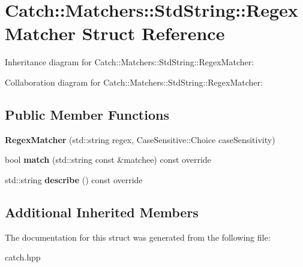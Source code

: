 \hypertarget{structCatch_1_1Matchers_1_1StdString_1_1RegexMatcher}{}\section{Catch\+:\+:Matchers\+:\+:Std\+String\+:\+:Regex\+Matcher Struct Reference}
\label{structCatch_1_1Matchers_1_1StdString_1_1RegexMatcher}


Inheritance diagram for Catch\+:\+:Matchers\+:\+:Std\+String\+:\+:Regex\+Matcher\+:


Collaboration diagram for Catch\+:\+:Matchers\+:\+:Std\+String\+:\+:Regex\+Matcher\+:
\subsection*{Public Member Functions}
\begin{DoxyCompactItemize}
\item 
\mbox{\label{structCatch_1_1Matchers_1_1StdString_1_1RegexMatcher_ab914deb885fe25558c41ab368c6b3916}} 
{\bfseries Regex\+Matcher} (std\+::string regex, Case\+Sensitive\+::\+Choice case\+Sensitivity)
\item 
\mbox{\label{structCatch_1_1Matchers_1_1StdString_1_1RegexMatcher_aa8e61adccabb2f36133029301f6b8f4e}} 
bool {\bfseries match} (std\+::string const \&matchee) const override
\item 
\mbox{\label{structCatch_1_1Matchers_1_1StdString_1_1RegexMatcher_a1f788cd5258c987e5043f6c7f43adeb9}} 
std\+::string {\bfseries describe} () const override
\end{DoxyCompactItemize}
\subsection*{Additional Inherited Members}


The documentation for this struct was generated from the following file\+:\begin{DoxyCompactItemize}
\item 
catch.\+hpp\end{DoxyCompactItemize}
